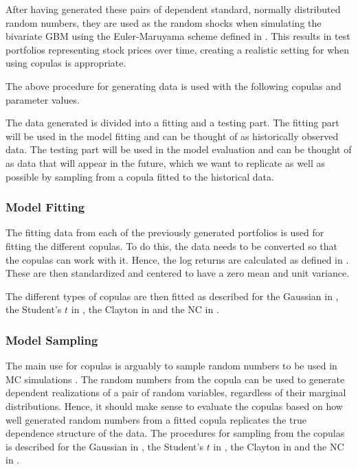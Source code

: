 After having generated these pairs of dependent standard, normally distributed random numbers, they are used as the random shocks when simulating the bivariate \gls{GBM} using the Euler-Maruyama scheme defined in . This results in test portfolios representing stock prices over time, creating a realistic setting for when using copulas is appropriate. 

The above procedure for generating data is used with the following copulas and parameter values. 

The data generated is divided into a fitting and a testing part. The fitting part will be used in the model fitting and can be thought of as historically observed data. The testing part will be used in the model evaluation and can be thought of as data that will appear in the future, which we want to replicate as well as possible by sampling from a copula fitted to the historical data. 

\subsubsection{Model Fitting}
The fitting data from each of the previously generated portfolios is used for fitting the different copulas. To do this, the data needs to be converted so that the copulas can work with it. Hence, the log returns are calculated as defined in . These are then standardized and centered to have a zero mean and unit variance. 

The different types of copulas are then fitted as described for the Gaussian in , the Student's $t$ in , the Clayton in  and the \gls{NC} in . 


\subsubsection{Model Sampling}
The main use for copulas is arguably to sample random numbers to be used in \gls{MC} simulations . The random numbers from the copula can be used to generate dependent realizations of a pair of random variables, regardless of their marginal distributions. Hence, it should make sense to evaluate the copulas based on how well generated random numbers from a fitted copula replicates the true dependence structure of the data. The procedures for sampling from the copulas is described for the Gaussian in , the Student's $t$ in , the Clayton in  and the \gls{NC} in . 

